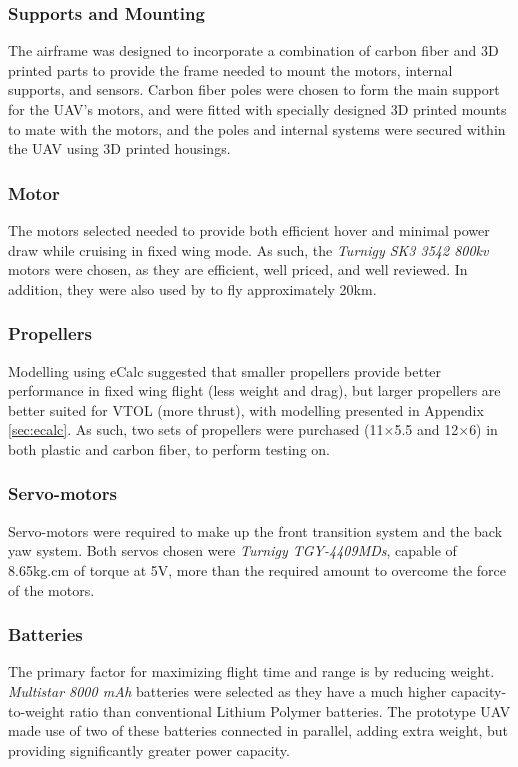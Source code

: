 \subsubsection*{Supports and Mounting}
The airframe was designed to incorporate a combination of carbon fiber and 3D printed parts to provide the frame needed to mount the motors, internal supports, and sensors. Carbon fiber poles were chosen to form the main support for the UAV's motors, and were fitted with specially designed 3D printed mounts to mate with the motors, and the poles and internal systems were secured within the UAV using 3D printed housings.
	
\subsubsection*{Motor}
The motors selected needed to provide both efficient hover and minimal power draw while cruising in fixed wing mode. As such, the \textit{Turnigy SK3 3542 800kv} motors were chosen, as they are efficient, well priced, and well reviewed. In addition, they were also used by \cite{ref:fireflyinstruction} to fly approximately 20km.
	
\subsubsection*{Propellers}
Modelling using eCalc suggested that smaller propellers provide better performance in fixed wing flight (less weight and drag), but larger propellers are better suited for VTOL (more thrust), with modelling presented in Appendix \ref{sec:ecalc}. As such, two sets of propellers were purchased (11$\times$5.5 and 12$\times$6) in both plastic and carbon fiber, to perform testing on.
	
\subsubsection*{Servo-motors}
Servo-motors were required to make up the front transition system and the back yaw system. Both servos chosen were \textit{Turnigy TGY-4409MDs}, capable of 8.65kg.cm of torque at 5V, more than the required amount to overcome the force of the motors. 
		
\subsubsection*{Batteries}
The primary factor for maximizing flight time and range is by reducing weight. \textit{Multistar 8000 mAh} batteries were selected as they have a much higher capacity-to-weight ratio than conventional Lithium Polymer batteries. The prototype UAV made use of two of these batteries connected in parallel, adding extra weight, but providing significantly greater power capacity.


